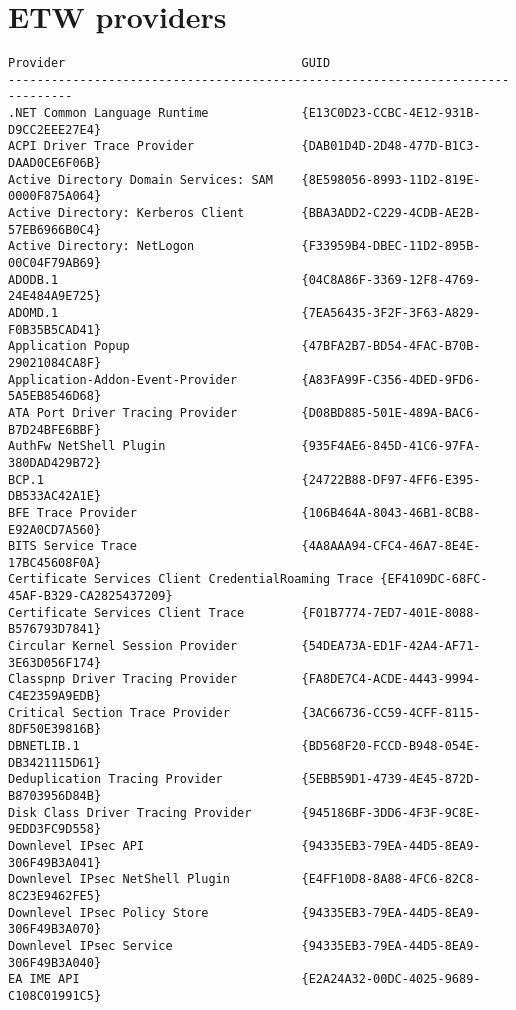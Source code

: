 \documentclass{report}
\begin{document}
\section*{ETW providers}
\label{appendix:etw-providers}
\begin{lstlisting}[breaklines=true,basicstyle=\tiny]
Provider                                 GUID
-------------------------------------------------------------------------------
.NET Common Language Runtime             {E13C0D23-CCBC-4E12-931B-D9CC2EEE27E4}
ACPI Driver Trace Provider               {DAB01D4D-2D48-477D-B1C3-DAAD0CE6F06B}
Active Directory Domain Services: SAM    {8E598056-8993-11D2-819E-0000F875A064}
Active Directory: Kerberos Client        {BBA3ADD2-C229-4CDB-AE2B-57EB6966B0C4}
Active Directory: NetLogon               {F33959B4-DBEC-11D2-895B-00C04F79AB69}
ADODB.1                                  {04C8A86F-3369-12F8-4769-24E484A9E725}
ADOMD.1                                  {7EA56435-3F2F-3F63-A829-F0B35B5CAD41}
Application Popup                        {47BFA2B7-BD54-4FAC-B70B-29021084CA8F}
Application-Addon-Event-Provider         {A83FA99F-C356-4DED-9FD6-5A5EB8546D68}
ATA Port Driver Tracing Provider         {D08BD885-501E-489A-BAC6-B7D24BFE6BBF}
AuthFw NetShell Plugin                   {935F4AE6-845D-41C6-97FA-380DAD429B72}
BCP.1                                    {24722B88-DF97-4FF6-E395-DB533AC42A1E}
BFE Trace Provider                       {106B464A-8043-46B1-8CB8-E92A0CD7A560}
BITS Service Trace                       {4A8AAA94-CFC4-46A7-8E4E-17BC45608F0A}
Certificate Services Client CredentialRoaming Trace {EF4109DC-68FC-45AF-B329-CA2825437209}
Certificate Services Client Trace        {F01B7774-7ED7-401E-8088-B576793D7841}
Circular Kernel Session Provider         {54DEA73A-ED1F-42A4-AF71-3E63D056F174}
Classpnp Driver Tracing Provider         {FA8DE7C4-ACDE-4443-9994-C4E2359A9EDB}
Critical Section Trace Provider          {3AC66736-CC59-4CFF-8115-8DF50E39816B}
DBNETLIB.1                               {BD568F20-FCCD-B948-054E-DB3421115D61}
Deduplication Tracing Provider           {5EBB59D1-4739-4E45-872D-B8703956D84B}
Disk Class Driver Tracing Provider       {945186BF-3DD6-4F3F-9C8E-9EDD3FC9D558}
Downlevel IPsec API                      {94335EB3-79EA-44D5-8EA9-306F49B3A041}
Downlevel IPsec NetShell Plugin          {E4FF10D8-8A88-4FC6-82C8-8C23E9462FE5}
Downlevel IPsec Policy Store             {94335EB3-79EA-44D5-8EA9-306F49B3A070}
Downlevel IPsec Service                  {94335EB3-79EA-44D5-8EA9-306F49B3A040}
EA IME API                               {E2A24A32-00DC-4025-9689-C108C01991C5}

\end{lstlisting}
\end{document}
